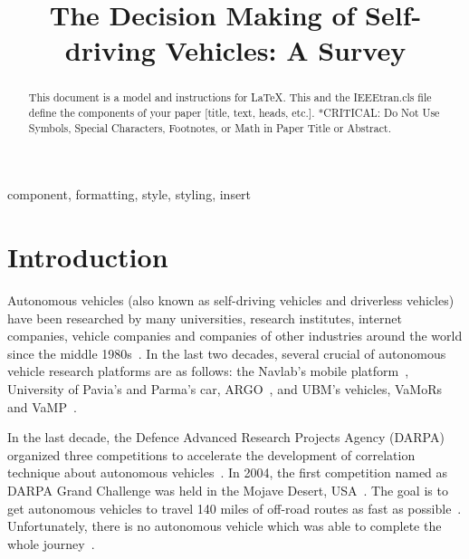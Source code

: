 \documentclass[conference]{IEEEtran}
\begin{document}
\title{The Decision Making of Self-driving Vehicles: A Survey}

\author{


}

\maketitle

\begin{abstract}
This document is a model and instructions for \LaTeX.
This and the IEEEtran.cls file define the components of your paper [title, text, heads, etc.]. *CRITICAL: Do Not Use Symbols, Special Characters, Footnotes, 
or Math in Paper Title or Abstract.
\end{abstract}

\begin{IEEEkeywords}
component, formatting, style, styling, insert
\end{IEEEkeywords}

\section{Introduction}
Autonomous vehicles (also known as self-driving vehicles and driverless vehicles) have been researched by many universities, research institutes, internet companies, vehicle companies and companies of other industries around the world since the middle 1980s~\cite{self_driving}. In the last two decades, several crucial of autonomous vehicle research platforms are as follows: the Navlab's mobile platform~\cite{Thorpe199144}, University of Pavia's and Parma's car, ARGO~\cite{Broggi199955}, and UBM's vehicles, VaMoRs and VaMP~\cite{Gregor200248}.

In the last decade, the Defence Advanced Research Projects Agency (DARPA) organized three competitions to accelerate the development of correlation technique about autonomous vehicles~\cite{Brian2016}. In 2004, the first competition named as DARPA Grand Challenge was held in the Mojave Desert, USA~\cite{self_driving}. The goal is to get autonomous vehicles to travel 140 miles of off-road routes as fast as possible~\cite{Brian2016}. Unfortunately, there is no autonomous vehicle which was able to complete the whole journey~\cite{self_driving}.
\end{document}
